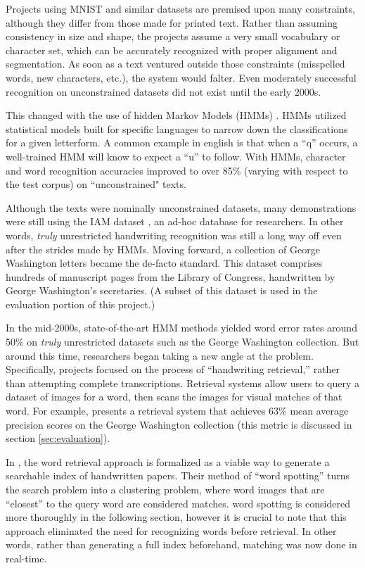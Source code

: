 \documentclass[final]{ukthesis}
\begin{document}
Projects using MNIST and similar datasets are premised upon many constraints, although they differ from those made for printed text. Rather than assuming consistency in size and shape, the projects assume a very small vocabulary or character set, which can be accurately recognized with proper alignment and segmentation. As soon as a text ventured outside those constraints (misspelled words, new characters, etc.), the system would falter. Even moderately successful recognition on unconstrained datasets did not exist until the early 2000s.

This changed with the use of hidden Markov Models (HMMs) \cite{marti2001using,bunke2004offline,el1999hmm}. HMMs utilized statistical models built for specific languages to narrow down the classifications for a given letterform. A common example in english is that when a ``q'' occurs, a well-trained HMM will know to expect a ``u'' to follow. With HMMs, character and word recognition accuracies improved to over 85\% (varying with respect to the test corpus) on ``unconstrained" texts.

Although the texts were nominally unconstrained datasets, many demonstrations were still using the IAM dataset \cite{marti2002iam}, an ad-hoc database for researchers. In other words, {\em truly} unrestricted handwriting recognition was still a long way off even after the strides made by HMMs. Moving forward, a collection of George Washington letters became the de-facto standard. This dataset comprises hundreds of manuscript pages from the Library of Congress, handwritten by George Washington's secretaries. (A subset of this dataset is used in the evaluation portion of this project.)

In the mid-2000s, state-of-the-art HMM methods yielded word error rates around 50\% on {\em truly} unrestricted datasets such as the George Washington collection. But around this time, researchers began taking a new angle at the problem. Specifically, projects focused on the process of ``handwriting retrieval,'' rather than attempting complete transcriptions. Retrieval systems allow users to query a dataset of images for a word, then scans the images for visual matches of that word. For example, \cite{rath2004search} presents a retrieval system that achieves 63\% mean average precision scores on the George Washington collection (this metric is discussed in section \ref{sec:evaluation}).

In \cite{rath2007word}, the word retrieval approach is formalized as a viable way to generate a searchable index of handwritten papers. Their method of ``word spotting'' turns the search problem into a clustering problem, where word images that are ``closest'' to the query word are considered matches. word spotting is considered more thoroughly in the following section, however it is crucial to note that this approach eliminated the need for recognizing words before retrieval. In other words, rather than generating a full index beforehand, matching was now done in real-time.
\end{document}
